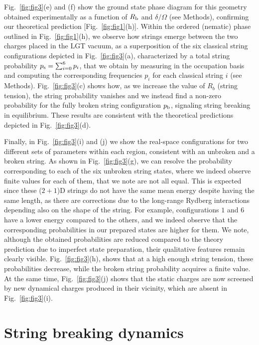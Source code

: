 \documentclass[footinbib,a4paper,aps,superscriptaddress,twocolumn,preprintnumbers,amsmath,amssymb,nobalancelastpage,10pt,prl]{revtex4-2}
\begin{document}
Fig.~\ref{fig:fig3}(e) and (f) show the ground state phase diagram for this geometry obtained experimentally as a function of $R_{\rm b}$ and $\delta / \Omega$ (see Methods), confirming our theoretical prediction [Fig.~\ref{fig:fig1}(h)]. Within the ordered (nematic) phase outlined in Fig.~\ref{fig:fig1}(h), we observe how strings emerge between the two charges placed in the LGT vacuum, as a superposition of the six classical string configurations depicted in Fig.~\ref{fig:fig3}(a), characterized by a total string probability $p_{\rm s} = \sum_{i=0}^6 p_i$, that we obtain by measuring in the occupation basis and computing the corresponding frequencies $p_i$ for each classical string $i$ (see Methods). Fig.~\ref{fig:fig3}(c) shows how, as we increase the value of $R_{b}$ (string tension), the string probability vanishes and we instead find a non-zero probability for the fully broken string configuration $p_{\rm b}$, signaling string breaking in equilibrium. These results are consistent with the theoretical predictions depicted in Fig.~\ref{fig:fig3}(d).

Finally, in Fig.~\ref{fig:fig3}(i) and (j) we show the real-space configurations for two different sets of parameters within each region, consistent with an unbroken and a broken string. As shown in Fig.~\ref{fig:fig3}(g), we can resolve the probability corresponding to each of the six unbroken string states, where we indeed observe finite values for each of them, that we note are not all equal. This is expected since these ($2+1$)D strings do not have the same mean energy despite having the same length, as there are corrections due to the long-range Rydberg interactions depending also on the shape of the string. For example, configurations $1$ and $6$ have a lower energy compared to the others, and we indeed observe that the corresponding probabilities in our prepared states are higher for them. We note, although the obtained probabilities are reduced compared to the theory prediction due to imperfect state preparation, their qualitative features remain clearly visible. Fig.~\ref{fig:fig3}(h), shows that at a high enough string tension, these probabilities decrease, while the broken string probability acquires a finite value.  At the same time, Fig.~\ref{fig:fig3}(j) shows that the static charges are now screened by new dynamical charges produced in their vicinity, which are absent in Fig.~\ref{fig:fig3}(i).

\section*{String breaking dynamics}
\end{document}
